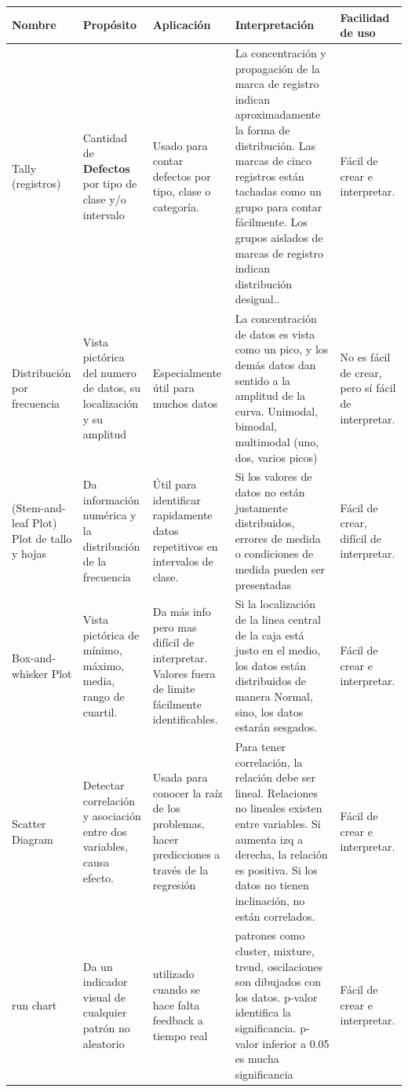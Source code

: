 \documentclass[oneside]{book}
\begin{document}
\begin{tabular}{p{2cm}|p{2.5cm}|p{3cm}|p{5cm}|p{2.5cm}}
	\hline Nombre & Propósito & Aplicación & Interpretación & Facilidad de uso \\ 
	\hline Tally (registros) & Cantidad de \textbf{Defectos} por tipo de clase y/o intervalo & Usado para contar defectos por tipo, clase o categoría. & La concentración y propagación de la marca de registro indican aproximadamente la forma de distribución. Las marcas de cinco registros están tachadas como un grupo para contar fácilmente. Los grupos aislados de marcas de registro indican distribución desigual.. & Fácil de crear e interpretar.  \\ 
    \hline Distribución por frecuencia & Vista pictórica del numero de datos, su localización y su amplitud & Especialmente útil para muchos datos & La concentración de datos es vista como un pico, y los demás datos dan sentido a la amplitud de la curva. Unimodal, bimodal, multimodal (uno, dos, varios picos) & No es fácil de crear, pero sí fácil de interpretar. \\
    \hline (Stem-and-leaf Plot) Plot de tallo y hojas & Da información numérica y la distribución de la frecuencia & Útil para identificar rapidamente datos repetitivos en intervalos de clase. & Si los valores de datos no están justamente distribuidos, errores de medida o condiciones de medida pueden ser presentadas & Fácil de crear, difícil de interpretar. \\
    \hline Box-and-whisker Plot & Vista pictórica de mínimo, máximo, media, rango de cuartil. & Da más info pero mas difícil de interpretar. Valores fuera de limite fácilmente identificables. & Si la localización de la linea central de la caja está justo en el medio, los datos están distribuidos de manera Normal, sino, los datos estarán sesgados.  &  Fácil de crear e interpretar. \\
    \hline Scatter Diagram & Detectar correlación y asociación entre dos variables, causa efecto. & Usada para conocer la raíz de los problemas, hacer predicciones a través de la regresión & Para tener correlación, la relación debe ser lineal. Relaciones no lineales existen entre variables. Si aumenta izq a derecha, la relación es positiva. Si los datos no tienen inclinación, no están correlados. & Fácil de crear e interpretar. \\
    \hline run chart & Da un indicador visual de cualquier patrón no aleatorio & utilizado cuando se hace falta feedback a tiempo real & patrones como cluster, mixture, trend, oscilaciones son dibujados con los datos. p-valor identifica la significancia. p-valor inferior a 0.05 es mucha significancia & Fácil de crear e interpretar. \\
	\hline 
\end{tabular} 
\end{document}
